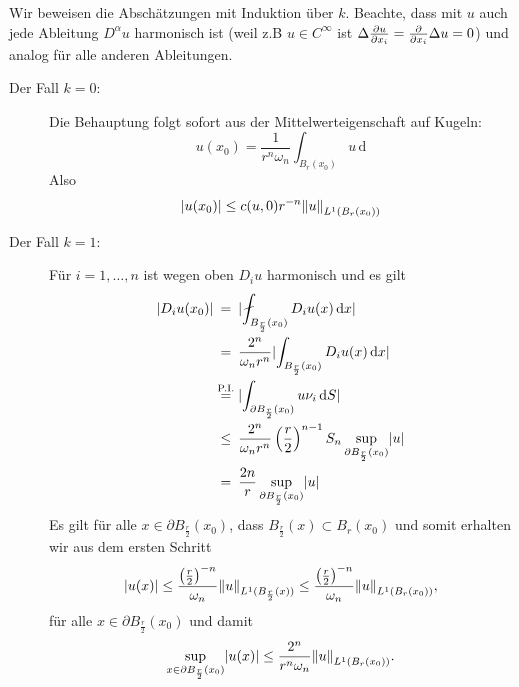 \begin{beweis}
	Wir beweisen die Abschätzungen mit Induktion über $k$. 
	Beachte, dass mit $u$ auch jede Ableitung $D^{\alpha}u$ harmonisch ist (weil z.B $u \in C^{\infty}$ ist $\Delta \frac{{\partial u}}{{\partial x_i}} = \frac{{\partial }}{{\partial x_i}} \Delta u = 0$) 
	und analog für alle anderen Ableitungen.
	\begin{description}
		\item[Der Fall $k=0$:] Die Behauptung folgt sofort aus der Mittelwerteigenschaft auf Kugeln:
		\begin{equation}
			u(x_0) = \frac{1}{r^n \omega_n} \int_{B_r(x_0)}^{}u \,\mathrm{d}
		\end{equation} 
		Also 
		\begin{equation}
			\abs{u(x_0)} \leq c(u,0)r^{-n} \norm{u}_{L^1(B_r(x_0))}
		\end{equation}
		\item[Der Fall $k=1$:] Für $i=1,\dots,n$ ist wegen oben $D_iu$ harmonisch und es gilt
		\begin{align*}
			\abs{D_i u(x_0)} & \stackrel{\hphantom{\text{P.I.}}}{=} \abs{ \fint_{B_{\frac{r}{2}}(x_0)}^{} D_iu(x) \,\mathrm{d}x} \\
			& \stackrel{\hphantom{\text{P.I.}}}{=} \frac{2^n}{\omega_n r^n} \abs{\int_{B_{\frac{r}{2}}(x_0)}^{}D_i u(x) \,\mathrm{d}x} \\
			& \stackrel{\text{P.I.}}{=} \abs{\int_{ \partial B_{\frac{r}{2}}(x_0)}^{} u \nu_i\,\mathrm{d}S} \\
			& \stackrel{\hphantom{\text{P.I.}}}{\leq} \frac{2^n}{\omega_n r^n} \left( \frac{r}{2} \right)^{n-1}S_n \sup_{\partial B_{\frac{r}{2}}(x_0)}\abs{u} \\
			& \stackrel{\hphantom{\text{P.I.}}}{=} \frac{2n}{r} \sup_{\partial B_{\frac{r}{2}}(x_0)}\abs{u}
		\end{align*}
		Es gilt für alle $x \in \partial B_{\frac{r}{2}}(x_0)$, dass $B_{\frac{r}{2}}(x) \subset B_r(x_0)$ und somit erhalten wir aus dem ersten Schritt
		\begin{equation}
			\abs{u(x)} \leq \frac{\left( \frac{r}{2} \right)^{-n}}{\omega_n} \norm{u}_{L^1(B_{\frac{r}{2}}(x))} 
			\leq \frac{\left( \frac{r}{2} \right)^{-n}}{\omega_n} \norm{u}_{L^1(B_r(x_0))},
		\end{equation}
		für alle $x \in \partial B_{\frac{r}{2}}(x_0)$ und damit
		\begin{equation}
			\sup_{x \in \partial B_{\frac{r}{2}}(x_0)}\abs{u(x)} \leq \frac{2^n}{r^n \omega_n} \norm{u}_{L^1(B_r(x_0))}.
		\end{equation}

\end{description}
\end{beweis}
